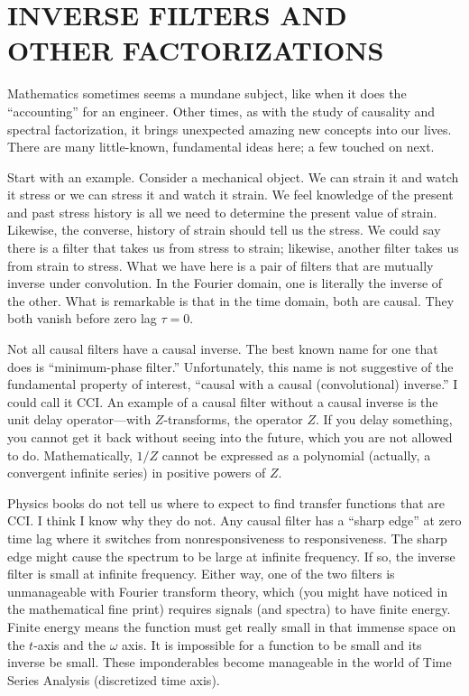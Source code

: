 \section{INVERSE FILTERS AND OTHER FACTORIZATIONS}
Mathematics sometimes seems a mundane subject,
like when it does the ``accounting'' for an engineer.
Other times,
as with the study of causality and spectral factorization,
it brings unexpected amazing new concepts into our lives.
There are many little-known, fundamental ideas here;
a few touched on next.
\par
Start with an example.  Consider a mechanical object.
We can strain it and watch it stress or we can stress it and watch it strain.
We feel knowledge of the present and past stress history is all we need
to determine the present value of strain.
Likewise, the converse, history of strain should tell us the stress.
We could say there is a filter that takes us from stress to strain;
likewise,
another filter takes us from strain to stress.
What we have here is a pair of filters that are mutually inverse
under convolution.
In the Fourier domain, one is literally the inverse of the other.
What is remarkable is that in the time domain, both are causal.
They both vanish before zero lag $\tau=0$.
\par
Not all causal filters have a causal inverse.
The best known name for one that does is ``minimum-phase filter.''
Unfortunately, this name is not suggestive of
the fundamental property of interest,
``causal with a causal (convolutional) inverse.''
I could call it CCI.
An example of a causal filter without a causal inverse is the unit
delay operator---with $Z$-transforms, the operator $Z$.
If you delay something, you cannot get it back without seeing into the future,
which you are not allowed to do.
Mathematically, $1/Z$ cannot be expressed as a polynomial
(actually, a convergent infinite series) in positive powers of $Z$.
\par
Physics books do not tell us where to expect to find
transfer functions that are CCI.
I think I know why they do not.
Any causal filter has a ``sharp edge'' at zero time lag where it switches
from nonresponsiveness to responsiveness.
The sharp edge might cause the spectrum to be large at infinite frequency.
If so, the inverse filter is small at infinite frequency.
Either way,
one of the two filters is unmanageable with Fourier transform theory,
which
(you might have noticed in the mathematical fine print)
requires signals (and spectra) to have finite energy.
Finite energy means the function must get really small in that immense space
on the $t$-axis and the $\omega$ axis.
It is impossible for a function to be small and its inverse be small.
These imponderables become manageable in the world of Time Series Analysis
(discretized time axis).
